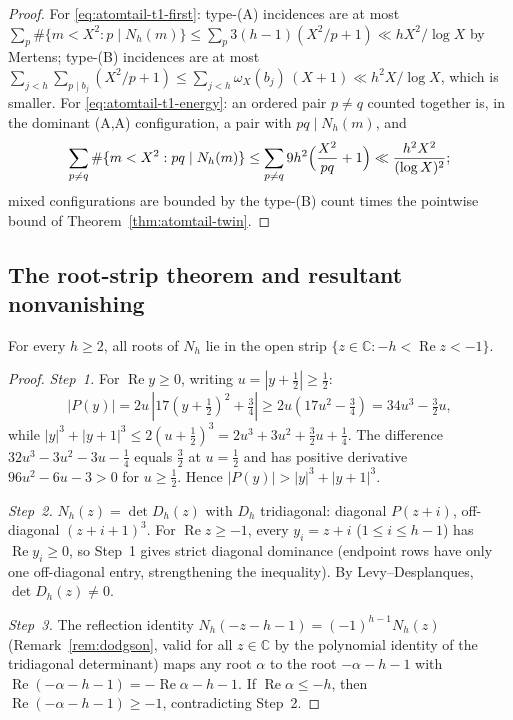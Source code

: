 \begin{proof}
For \eqref{eq:atomtail-t1-first}: type-(A) incidences are at most
$\sum_{p}\#\{m<X^2:p\mid N_h(m)\}
\le\sum_p 3(h-1)(X^2/p+1)\ll hX^2/\log X$ by Mertens; type-(B)
incidences are at most
$\sum_{j<h}\sum_{p\mid b_j}(X^2/p+1)
\le\sum_{j<h}\omega_X(b_j)\,(X+1)\ll h^2X/\log X$,
which is smaller.  For \eqref{eq:atomtail-t1-energy}: an ordered
pair $p\ne q$ counted together is, in the dominant (A,A)
configuration, a pair with $pq\mid N_h(m)$, and
\[
 \sum_{p\ne q}\#\{m<X^2:pq\mid N_h(m)\}
 \le\sum_{p\ne q}9h^2\Bigl(\frac{X^2}{pq}+1\Bigr)
 \ll\frac{h^2X^2}{(\log X)^2};
\]
mixed configurations are bounded by the type-(B) count times the
pointwise bound of Theorem~\ref{thm:atomtail-twin}.
\end{proof}

\subsection{The root-strip theorem and resultant nonvanishing}

\begin{theorem}\label{thm:atomtail-rootstrip}
For every $h \ge 2$, all roots of $N_h$ lie in the open strip
$\{z \in \mathbb{C} : -h < \operatorname{Re} z < -1\}$.
\end{theorem}

\begin{proof}
\emph{Step~1.}  For $\operatorname{Re} y \ge 0$, writing
$u = |y + \tfrac12| \ge \tfrac12$:
\[
  |P(y)| = 2u\,|17(y{+}\tfrac12)^2 + \tfrac34|
  \ge 2u(17u^2 - \tfrac34) = 34u^3 - \tfrac32 u,
\]
while $|y|^3 + |y{+}1|^3 \le 2(u + \tfrac12)^3
= 2u^3 + 3u^2 + \tfrac32 u + \tfrac14$.
The difference $32u^3 - 3u^2 - 3u - \tfrac14$ equals
$\tfrac32$ at $u = \tfrac12$ and has positive derivative
$96u^2 - 6u - 3 > 0$ for $u \ge \tfrac12$.
Hence $|P(y)| > |y|^3 + |y{+}1|^3$.

\emph{Step~2.}  $N_h(z) = \det D_h(z)$ with
$D_h$ tridiagonal: diagonal $P(z{+}i)$,
off-diagonal $(z{+}i{+}1)^3$.
For $\operatorname{Re} z \ge -1$, every $y_i = z + i$
($1 \le i \le h{-}1$) has $\operatorname{Re} y_i \ge 0$,
so Step~1 gives strict diagonal dominance
(endpoint rows have only one off-diagonal entry, strengthening
the inequality).
By Levy--Desplanques, $\det D_h(z) \ne 0$.

\emph{Step~3.}  The reflection identity
$N_h(-z{-}h{-}1) = (-1)^{h-1} N_h(z)$
(Remark~\ref{rem:dodgson}, valid for all $z \in \mathbb{C}$
by the polynomial identity of the tridiagonal determinant)
maps any root $\alpha$ to the root $-\alpha{-}h{-}1$
with $\operatorname{Re}(-\alpha{-}h{-}1)
= -\operatorname{Re}\alpha - h - 1$.
If $\operatorname{Re}\alpha \le -h$, then
$\operatorname{Re}(-\alpha{-}h{-}1) \ge -1$,
contradicting Step~2.
\end{proof}

